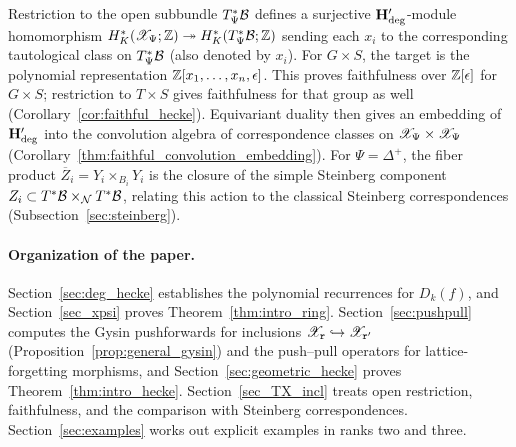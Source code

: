 Restriction to the open subbundle $T^*_\Psi\mathcal B$ defines a surjective $\mathbf H_{\mathrm{deg}}'$-module homomorphism $H_K^*(\mathscr X_\Psi;\mathbb Z)\twoheadrightarrow H_K^*(T^*_\Psi\mathcal B;\mathbb Z)$ sending each $x_i$ to the corresponding tautological class on $T^*_\Psi\mathcal B$ (also denoted by $x_i$). For $G\times S$, the target is the polynomial representation $\mathbb Z[x_1,\dots,x_n,\epsilon]$. This proves faithfulness over $\mathbb Z[\epsilon]$ for $G\times S$; restriction to $T\times S$ gives faithfulness for that group as well (Corollary~\ref{cor:faithful_hecke}). Equivariant duality then gives an embedding of $\mathbf H_{\mathrm{deg}}'$ into the convolution algebra of correspondence classes on $\mathscr X_\Psi\times\mathscr X_\Psi$ (Corollary~\ref{thm:faithful_convolution_embedding}). For $\Psi=\Delta^+$, the fiber product $\overline Z_i=Y_i\times_{B_i}Y_i$ is the closure of the simple Steinberg component $Z_i\subset T^*\mathcal B\times_{\mathcal N}T^*\mathcal B$, relating this action to the classical Steinberg correspondences (Subsection~\ref{sec:steinberg}).

\paragraph{Organization of the paper.}
Section~\ref{sec:deg_hecke} establishes the polynomial recurrences for $D_k(f)$, and Section~\ref{sec_xpsi} proves Theorem~\ref{thm:intro_ring}.
Section~\ref{sec:pushpull} computes the Gysin pushforwards for inclusions $\mathscr X_{\mathtt r}\hookrightarrow\mathscr X_{\mathtt r'}$ (Proposition~\ref{prop:general_gysin}) and the push--pull operators for lattice-forgetting morphisms, and Section~\ref{sec:geometric_hecke} proves Theorem~\ref{thm:intro_hecke}.
Section~\ref{sec_TX_incl} treats open restriction, faithfulness, and the comparison with Steinberg correspondences. Section~\ref{sec:examples} works out explicit examples in ranks two and three.
